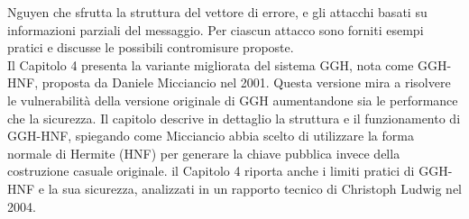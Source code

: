 Nguyen che sfrutta la struttura del vettore di errore, e gli attacchi basati su 
informazioni parziali del messaggio. Per ciascun attacco sono forniti esempi pratici e 
discusse le possibili contromisure proposte. \\
Il Capitolo 4 presenta la variante migliorata del sistema GGH, nota come GGH-HNF, 
proposta da Daniele Micciancio nel 2001. Questa versione mira a risolvere le 
vulnerabilità della versione originale di GGH aumentandone sia le performance che la 
sicurezza. Il capitolo descrive in dettaglio la struttura e il funzionamento di GGH-HNF, 
spiegando come Micciancio abbia scelto di utilizzare la forma normale di Hermite (HNF) 
per generare la chiave pubblica invece della costruzione casuale originale. 
il Capitolo 4 riporta anche i limiti pratici di GGH-HNF e la sua sicurezza, 
analizzati in un rapporto tecnico di Christoph Ludwig nel 2004. 